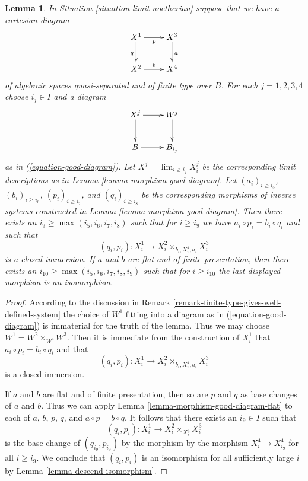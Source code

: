 \documentclass{stacks-project}
\theoremstyle{plain}
\newtheorem{lemma}[subsection]{Lemma}
\theoremstyle{definition}
\theoremstyle{remark}
\numberwithin{equation}{subsection}
\def\lim{\mathop{\mathrm{lim}}\nolimits}
\begin{document}
\begin{lemma}
\label{lemma-good-diagram-fibre-product}
In Situation \ref{situation-limit-noetherian} suppose that we have a
cartesian diagram
$$
\xymatrix{
X^1 \ar[r]_p \ar[d]_q & X^3 \ar[d]^a \\
X^2 \ar[r]^b & X^4
}
$$
of algebraic spaces quasi-separated and of finite type over $B$.
For each $j = 1, 2, 3, 4$ choose $i_j \in I$ and a diagram
$$
\xymatrix{
X^j \ar[r] \ar[d] & W^j \ar[d] \\
B \ar[r] & B_{i_j}
}
$$
as in (\ref{equation-good-diagram}). Let
$X^j = \lim_{i \geq i_j} X^j_i$ be the corresponding limit descriptions
as in Lemma \ref{lemma-morphism-good-diagram}.
Let $(a_i)_{i \geq i_5}$, $(b_i)_{i \geq i_6}$, $(p_i)_{i \geq i_7}$, and
$(q_i)_{i \geq i_8}$ be the corresponding morphisms of inverse systems
constructed in Lemma \ref{lemma-morphism-good-diagram}. Then there exists an
$i_9 \geq \max(i_5, i_6, i_7, i_8)$ such that for $i \geq i_9$ we have
$a_i \circ p_i = b_i \circ q_i$ and such that
$$
(q_i, p_i) : X^1_i \longrightarrow X^2_i \times_{b_i, X^4_i, a_i} X^3_i
$$
is a closed immersion.
If $a$ and $b$ are flat and of finite presentation, then there exists an
$i_{10} \geq \max(i_5, i_6, i_7, i_8, i_9)$ such that for $i \geq i_{10}$
the last displayed morphism is an isomorphism.
\end{lemma}

\begin{proof}
According to the discussion in
Remark \ref{remark-finite-type-gives-well-defined-system}
the choice of $W^1$ fitting into a diagram as in
(\ref{equation-good-diagram}) is immaterial for the truth of
the lemma. Thus we may choose $W^1 = W^2 \times_{W^4} W^3$.
Then it is immediate from the construction of $X^1_i$ that 
$a_i \circ p_i = b_i \circ q_i$ and that
$$
(q_i, p_i) : X^1_i \longrightarrow X^2_i \times_{b_i, X^4_i, a_i} X^3_i
$$
is a closed immersion.

\medskip\noindent
If $a$ and $b$ are flat and of finite presentation, then so are
$p$ and $q$ as base changes of $a$ and $b$. Thus we can apply
Lemma \ref{lemma-morphism-good-diagram-flat}
to each of $a$, $b$, $p$, $q$, and $a \circ p = b \circ q$.
It follows that there exists an $i_9 \in I$ such that
$$
(q_i, p_i) : X^1_i \to X^2_i \times_{X^4_i} X^3_i
$$
is the base change of $(q_{i_9}, p_{i_9})$ by the morphism
by the morphism $X^4_i \to X^4_{i_9}$ for all $i \geq i_9$.
We conclude that $(q_i, p_i)$ is an isomorphism for all sufficiently
large $i$ by Lemma \ref{lemma-descend-isomorphism}.
\end{proof}
















\end{document}
